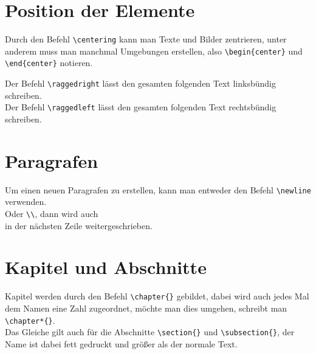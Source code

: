 \documentclass[ngerman]{scrreport}
\begin{document}
\section{Position der Elemente}
Durch den Befehl {\color{blue}\verb|\centering|} kann man Texte und Bilder zentrieren, unter anderem muss man manchmal Umgebungen erstellen, also {\color{blue}\verb|\begin{center}|} und {\color{blue}\verb|\end{center}|} notieren.\\
\raggedright Der Befehl {\color{blue}\verb|\raggedright|} lässt den gesamten folgenden Text linksbündig schreiben.\\
\raggedleft Der Befehl {\color{blue}\verb|\raggedleft|} lässt den gesamten folgenden Text rechtsbündig schreiben.
\raggedright

\section{Paragrafen}
Um einen neuen Paragrafen zu erstellen, kann man entweder den Befehl {\color{blue}\verb|\newline|} \newline verwenden.\\ Oder {\color{blue}\verb|\\|}, dann wird auch \\ in der nächsten Zeile weitergeschrieben.

\section{Kapitel und Abschnitte}
Kapitel werden durch den Befehl {\color{blue}\verb|\chapter{}|} gebildet, dabei wird auch jedes Mal dem Namen eine Zahl zugeordnet, möchte man dies umgehen, schreibt man {\color{blue}\verb|\chapter*{}|}.\\
Das Gleiche gilt auch für die Abschnitte {\color{blue}\verb|\section{}|} und {\color{blue}\verb|\subsection{}|}, der Name ist dabei fett gedruckt und größer als der normale Text.
\end{document}
